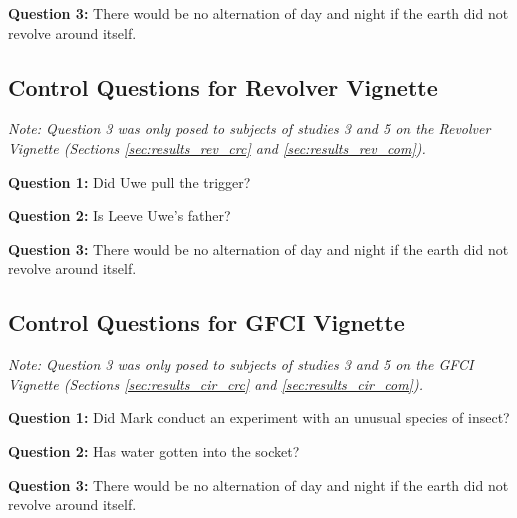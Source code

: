\documentclass[egregdoesnotlikesansseriftitles,12pt]{scrartcl}
\begin{document}
\vspace{1ex}
\noindent\textbf{Question 3:} There would be no alternation of day and night if the earth did not revolve around itself.%

\subsection{Control Questions for Revolver Vignette}\label{app:main_revolver_control}
\noindent\textit{Note: Question 3 was only posed to subjects of studies 3 and 5 on the Revolver Vignette (Sections \ref{sec:results_rev_crc} and \ref{sec:results_rev_com}).}

\vspace{1ex}
\noindent\textbf{Question 1:} Did Uwe pull the trigger?%

\vspace{1ex}
\noindent\textbf{Question 2:} Is Leeve Uwe's father?%

\vspace{1ex}
\noindent\textbf{Question 3:} There would be no alternation of day and night if the earth did not revolve around itself.%

\subsection{Control Questions for GFCI Vignette}\label{app:main_circuit_control}
\noindent\textit{Note: Question 3 was only posed to subjects of studies 3 and 5 on the GFCI Vignette (Sections \ref{sec:results_cir_crc} and \ref{sec:results_cir_com}).}

\vspace{1ex}
\noindent\textbf{Question 1:} Did Mark conduct an experiment with an unusual species of insect?%

\vspace{1ex}
\noindent\textbf{Question 2:} Has water gotten into the socket?%

\vspace{1ex}
\noindent\textbf{Question 3:} There would be no alternation of day and night if the earth did not revolve around itself.%
\end{document}
